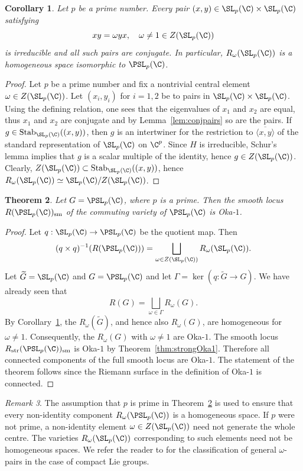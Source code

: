 \documentclass[12pt, a4paper, oneside]{amsart}
\DeclareMathOperator{\Stab}{Stab}
\theoremstyle{plain} %
\newtheorem{theorem}{Theorem}
\newtheorem{corollary}[theorem]{Corollary}
\theoremstyle{definition} %
\theoremstyle{remark} %
\newtheorem{remark}[theorem]{Remark}
\begin{document}
\begin{corollary}\label{cor:homogeneous}
Let $p$ be a prime number. Every pair $(x,y)\in \SL_p(\C)\times \SL_p(\C)$ satisfying 
\[xy=\omega yx,\quad \omega\neq 1\in Z(\SL_p(\C))\]
is irreducible and all such pairs are conjugate. In particular, $R_{\omega}(\SL_p(\C))$ is a homogeneous space isomorphic to $\PSL_p(\C)$.
\end{corollary}
\begin{proof}
Let $p$ be a prime number and fix a nontrivial central element $\omega\in Z(\SL_p(\C))$. Let $(x_i,y_i)$ for $i=1,2$ be to pairs in $\SL_p(\C)\times\SL_p(\C)$. Using the defining relation, one sees that the eigenvalues of $x_1$ and $x_2$ are equal, thus $x_1$ and $x_2$ are conjugate and by Lemma~\ref{lem:conjpairs} so are the pairs. If $g\in \Stab_{\SL_p(\C)}((x,y))$, then $g$ is an intertwiner for the restriction to $\overline{\langle x,y\rangle}$ of the standard representation of $\SL_p(\C)$ on $\C^p$. Since $H$ is irreducible, Schur's lemma implies that $g$ is a scalar multiple of the identity, hence $g\in Z(\SL_p(\C))$. Clearly, $Z(\SL_p(\C))\subset \Stab_{\SL_p(\C)}((x,y))$, hence $R_\omega(\SL_p(\C))\simeq \SL_p(\C)/Z(\SL_p(\C))$.
\end{proof}

\begin{theorem}\label{thm:Oka1PSLp}
Let $G=\PSL_p(\C)$, where $p$ is a prime. Then the smooth locus $R(\PSL_p(\C))_{\rm sm}$ of the commuting variety  of $\PSL_p(\C)$ is Oka-$1$.
\end{theorem}
\begin{proof}
Let $q:\SL_p(\C)\to \PSL_p(\C)$ be the quotient map. Then
\[(q\times q)^{-1}(R(\PSL_p(\C))) = \bigsqcup_{\omega\in Z(\SL_p(\C))}R_{\omega}(\SL_p(\C)).\]
Let $\widetilde{G}=\SL_p(\C)$ and $G=\PSL_p(\C)$ and let $\Gamma=\ker(q:\widetilde{G}\to G)$. We have already seen that
\[R(G) = \bigsqcup_{\omega\in \Gamma} R_\omega(G).\]
By Corollary~\ref{cor:homogeneous}, the $R_\omega(\widetilde{G})$, and hence also $R_\omega(G)$, are homogeneous for $\omega\neq 1$. Consequently, the $R_\omega(G)$ with $\omega\neq 1$ are Oka-$1$. The smooth locus $R_{\rm str}(\PSL_p(\C))_{\rm sm}$ is Oka-$1$ by Theorem~\ref{thm:strongOka1}. Therefore all connected components of the full smooth locus are Oka-$1$. The statement of the theorem follows since the Riemann surface in the definition of Oka-$1$ is connected.
\end{proof}

\begin{remark}
The assumption that $p$ is prime in Theorem~\ref{thm:Oka1PSLp} is used to ensure that every non-identity component $R_{\omega}(\PSL_p(\C))$ is a homogeneous space. If  $p$ were not prime, a non-identity element $\omega\in Z(\SL_p(\C))$ need not generate the whole centre. The varieties $R_\omega(\SL_p(\C))$ corresponding to such elements need not be homogeneous spaces. We refer the reader to \cite[\S 4]{BFM02} for the classification of general $\omega$-pairs in the case of compact Lie groups. 
\end{remark}
\end{document}
